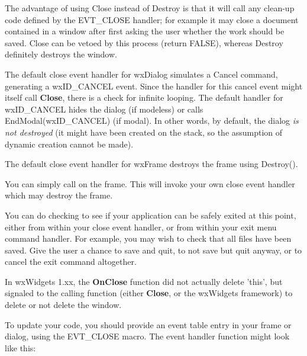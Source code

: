 The advantage of using Close instead of Destroy is that it will call any clean-up code
defined by the EVT\_CLOSE handler; for example it may close a document contained in
a window after first asking the user whether the work should be saved. Close can be vetoed
by this process (return FALSE), whereas Destroy definitely destroys the window.


The default close event handler for wxDialog simulates a Cancel command,
generating a wxID\_CANCEL event. Since the handler for this cancel event might
itself call {\bf Close}, there is a check for infinite looping. The default handler
for wxID\_CANCEL hides the dialog (if modeless) or calls EndModal(wxID\_CANCEL) (if modal).
In other words, by default, the dialog {\it is not destroyed} (it might have been created
on the stack, so the assumption of dynamic creation cannot be made).

The default close event handler for wxFrame destroys the frame using Destroy().
%


You can simply call  on the frame. This
will invoke your own close event handler which may destroy the frame.

You can do checking to see if your application can be safely exited at this point,
either from within your close event handler, or from within your exit menu command
handler. For example, you may wish to check that all files have been saved.
Give the user a chance to save and quit, to not save but quit anyway, or to cancel
the exit command altogether.


In wxWidgets 1.xx, the {\bf OnClose} function did not actually delete 'this', but signaled
to the calling function (either {\bf Close}, or the wxWidgets framework) to delete
or not delete the window.

To update your code, you should provide an event table entry in your frame or
dialog, using the EVT\_CLOSE macro. The event handler function might look like this:

